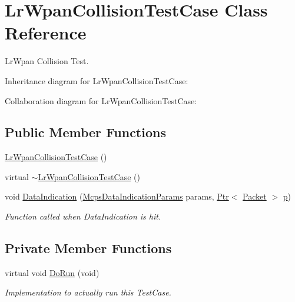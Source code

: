\hypertarget{classLrWpanCollisionTestCase}{}\section{Lr\+Wpan\+Collision\+Test\+Case Class Reference}
\label{classLrWpanCollisionTestCase}


Lr\+Wpan Collision Test.  




Inheritance diagram for Lr\+Wpan\+Collision\+Test\+Case\+:


Collaboration diagram for Lr\+Wpan\+Collision\+Test\+Case\+:
\subsection*{Public Member Functions}
\begin{DoxyCompactItemize}
\item 
\hyperlink{classLrWpanCollisionTestCase_afdc895dfc51296ffae23be652b1e4413}{Lr\+Wpan\+Collision\+Test\+Case} ()
\item 
virtual \hyperlink{classLrWpanCollisionTestCase_a812c9386727c845d84c959f3cc19c04f}{$\sim$\+Lr\+Wpan\+Collision\+Test\+Case} ()
\item 
void \hyperlink{classLrWpanCollisionTestCase_ab8b8d230a2bad7026b0b48a011f7c049}{Data\+Indication} (\hyperlink{structns3_1_1McpsDataIndicationParams}{Mcps\+Data\+Indication\+Params} params, \hyperlink{classns3_1_1Ptr}{Ptr}$<$ \hyperlink{classns3_1_1Packet}{Packet} $>$ \hyperlink{lte__link__budget__x2__handover__measures_8m_ac9de518908a968428863f829398a4e62}{p})
\begin{DoxyCompactList}\small\item\em Function called when Data\+Indication is hit. \end{DoxyCompactList}\end{DoxyCompactItemize}
\subsection*{Private Member Functions}
\begin{DoxyCompactItemize}
\item 
virtual void \hyperlink{classLrWpanCollisionTestCase_adc8f2378868d9eb3aba9b538897d85d2}{Do\+Run} (void)
\begin{DoxyCompactList}\small\item\em Implementation to actually run this Test\+Case. \end{DoxyCompactList}\end{DoxyCompactItemize}
